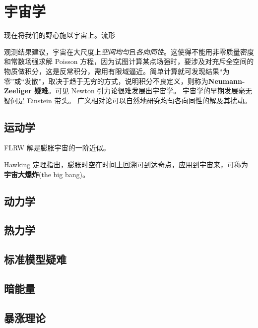 \chapter{宇宙学}\label{chpt:cosmos}

现在将我们的野心施以宇宙上。流形

观测结果建议，宇宙在大尺度上\textit{空间均匀}且\textit{各向同性}。这使得不能用非零质量密度和常数场强求解 Poisson 方程，因为试图计算某点场强时，要涉及对充斥全空间的物质做积分，这是反常积分，需用有限域逼近。简单计算就可发现结果“为零”或“发散”，取决于趋于无穷的方式，说明积分不良定义，则称为\textbf{Neumann-Zeeliger 疑难}。可见 Newton 引力论很难发展出宇宙学。
宇宙学的早期发展毫无疑问是 Einstein 带头。
广义相对论可以自然地研究均匀各向同性的解及其扰动。

\section{运动学}

FLRW 解是膨胀宇宙的一阶近似。


Hawking 定理指出，膨胀时空在时间上回溯可到达奇点，应用到宇宙来，可称为\textbf{宇宙大爆炸}(the big bang)。

\section{动力学}
\section{热力学}
\section{标准模型疑难}
\section{暗能量}
\section{暴涨理论}